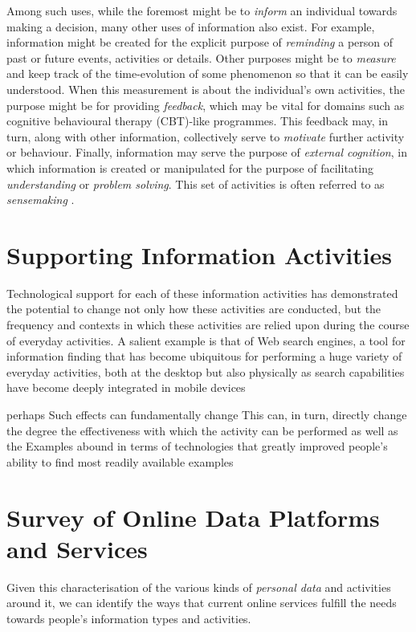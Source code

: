 \documentclass[runningheads,a4paper]{llncs}
\begin{document}
Among such uses, while the foremost might be to \emph{inform} an individual towards making a decision, many other uses of information also exist.  For example, information might be created for the explicit purpose of \emph{reminding} a person of past or future events, activities or details. Other purposes might be to \emph{measure} and keep track of the time-evolution of some phenomenon so that it can be easily understood.  When this measurement is about the individual's own activities, the purpose might be for providing \emph{feedback}, which may be vital for domains such as cognitive behavioural therapy (CBT)-like programmes.  This feedback may, in turn, along with other information, collectively serve to \emph{motivate} further activity or behaviour.  Finally, information may serve the purpose of \emph{external cognition}, in which information is created or manipulated for the purpose of facilitating \emph{understanding} or \emph{problem solving}.  This set of activities is often referred to as \emph{sensemaking} \cite{pirolli2005sensemaking}.

\section{Supporting Information Activities}

Technological support for each of these information activities has demonstrated the potential to change not only how these activities are conducted, but the frequency and contexts in which these activities are relied upon during the course of everyday activities.  A salient example is that of Web search engines, a tool for information finding that has become ubiquitous for performing a huge variety of everyday activities, both at the desktop but also physically as search capabilities have become deeply integrated in mobile devices

 perhaps Such effects can fundamentally change This can, in turn, directly change the degree the effectiveness with which the activity can be performed as well as the   Examples abound in terms of technologies that greatly improved people's ability to find most readily available examples

\section{Survey of Online Data Platforms and Services}

Given this characterisation of the various kinds of \emph{personal data} and activities around it, we can identify the ways that current online services fulfill the needs towards people's information types and activities.
\end{document}

